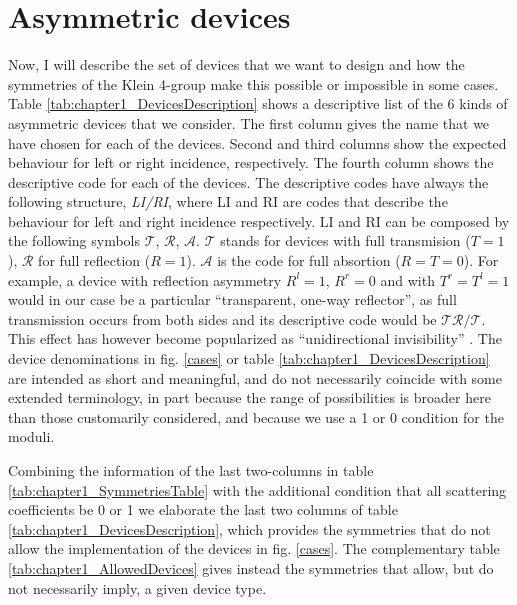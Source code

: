 \section{Asymmetric devices\label{sec:chapter1_AsymmetricDevices}}

Now, I will describe the set of devices that we want to design and how the symmetries of the Klein 4-group make this possible or impossible in some cases. Table \ref{tab:chapter1_DevicesDescription} shows a descriptive list of the 6 kinds of asymmetric devices that we consider. The first column gives the name that we have chosen for each of the devices. Second and third columns show the expected behaviour for left or right incidence, respectively. The fourth column shows the descriptive code for each of the devices. The descriptive codes have always the following structure, \textit{LI/RI}, where LI and RI are codes that describe the behaviour for left and right incidence respectively. LI and RI can be composed by the following symbols $\mathcal{T}$, $\mathcal{R}$, $\mathcal{A}$. $\mathcal{T}$ stands for devices with full transmision ($T=1$), $\mathcal{R}$ for full reflection ($R = 1$). $\mathcal{A}$ is the code for full absortion ($R=T=0$). For example, a device with reflection asymmetry $R^l=1$, $R^r=0$ and with $T^r=T^l=1$ would in our case be a particular ``transparent, one-way reflector'', as full transmission occurs from both sides and its descriptive code would be $\mathcal{T}\mathcal{R}/\mathcal{T}$. This effect has however become popularized as ``unidirectional invisibility'' \cite{Lin2011,Yin2013}. The device denominations in fig. \ref{cases} or table \ref{tab:chapter1_DevicesDescription} are intended as short and meaningful, and do not necessarily coincide with some extended terminology, in part because the range of possibilities is broader here than those customarily considered, and because we use a 1 or 0 condition for the moduli.

Combining the information of the last two-columns in table \ref{tab:chapter1_SymmetriesTable} with the additional condition that all scattering coefficients
be 0 or 1 we elaborate the last two columns of table \ref{tab:chapter1_DevicesDescription}, which provides the symmetries
that do not allow the implementation of the devices in fig. \ref{cases}. The complementary table \ref{tab:chapter1_AllowedDevices} gives instead the symmetries that allow, but do not necessarily imply, a given device type.




